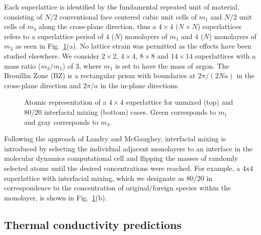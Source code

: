 \documentclass[aps,prb,preprint,preprintnumbers,amsmath,amssymb,floatfix,superscriptaddress]{revtex4}
\begin{document}
Each superlattice is identified by the fundamental repeated unit of material, consisting of $N/2$ conventional face centered cubic unit cells of $m_1$ and $N/2$ unit cells of $m_3$ along the cross-plane direction, thus a $4\times4$ ($N\times N$) superlattices refers to a superlattice period of 4 ($N$) monolayers of $m_1$ and 4 ($N$) monolayers of $m_3$ as seen in Fig.~\ref{fig:md_domain}(a). No lattice strain was permitted as the effects have been studied elsewhere.\cite{PhysRevB.72.174302}  We consider $2\times2$, $4\times4$, $8\times8$ and $14\times14$ superlattices with a mass ratio ($m_3/m_1$) of 3, where $m_1$ is set to have the mass of argon. The Brouillin Zone (BZ) is a rectangular prism with boundaries at $2\pi/(2Na)$ in the cross-plane direction and $2\pi/a$ in the in-plane directions.
\begin{figure}[ht!]
\begin{center}
\renewcommand{\figure}{Fig.}
\caption{Atomic representation of a $4\times4$ superlattice for unmixed (top) and 80/20 interfacial mixing (bottom) cases. Green corresponds to $m_1$ and gray corresponds to $m_3$.}
\label{fig:md_domain}
\end{center}
\end{figure}

Following the approach of Landry and McGaughey,\cite{PhysRevB.79.075316} interfacial mixing is introduced by selecting the individual adjacent monolayers to an interface in the molecular dynamics computational cell and flipping the masses of randomly selected atoms until the desired concentrations were reached. For example, a 4x4 superlattice with interfacial mixing, which we designate as 80/20 in correspondence to the concentration of original/foreign species within the monolayer, is shown in Fig.~\ref{fig:md_domain}(b).

\subsection{Thermal conductivity predictions}
\end{document}
